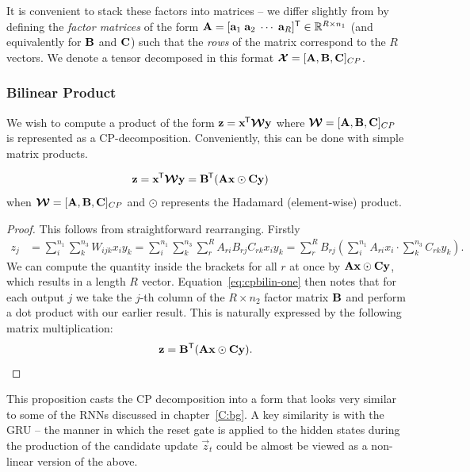 It is convenient to stack these factors into matrices --
we differ slightly from \autocite{Kolda2009} by defining the \textit{factor matrices} of the 
form \(\mathbf{A} = [\mathbf{a}_1\;\mathbf{a}_2\;\cdots\;\mathbf{a}_R]^{\mathsf{T}} \in 
\mathbb{R}^{R\times n_1}\) (and equivalently for
\(\mathbf{B}\) and \(\mathbf{C}\)) such that the  \textit{rows} of the matrix correspond to the
\(R\) vectors. 
We denote a tensor decomposed in this format 
\(\bm{\mathcal{X}} = [\mathbf{A}, \mathbf{B}, \mathbf{C}]_{CP}\).

\subsubsection{Bilinear Product}
We wish to compute a product of the form \(\mathbf{z} = \mathbf{x}^{\mkern-1.5mu\mathsf{T}}\bm{\mathcal{W}}\mathbf{y}\)
where \(\bm{\mathcal{W}} = [\mathbf{A}, \mathbf{B}, \mathbf{C}]_{CP}\) is represented as a CP-decomposition.
Conveniently, this can be done with simple matrix products.

\begin{prop} \label{prop:cpbilin}
\begin{align}
	\mathbf{z} &= \mathbf{x}^{\mkern-1.5mu\mathsf{T}}\bm{\mathcal{W}}\mathbf{y} 
			= \mathbf{B}^{\mkern-1.5mu\mathsf{T}}(\mathbf{A}\mathbf{x} \odot \mathbf{C}\mathbf{y})
\end{align}
when \(\bm{\mathcal{W}} = [\mathbf{A}, \mathbf{B}, \mathbf{C}]_{CP}\) and \(\odot\) represents the Hadamard
(element-wise) product.
\end{prop}
\begin{proof}
This follows from straightforward rearranging. Firstly
\begin{align}\label{eq:cpbilin-one}
	z_j &= \sum_{i}^{n_1} \sum_k^{n_3} W_{ijk} x_i y_k 
		= \sum_{i}^{n_1} \sum_k^{n_3} \sum_r^R A_{ri} B_{rj} C_{rk} x_i y_k
		= \sum_r^R B_{rj} \left( \sum_i^{n_1} A_{ri} x_i \cdot \sum_k^{n_3} C_{rk}y_k \right).
\end{align}
We can compute the quantity inside the brackets for all \(r\) at once
by \(\mathbf{A}\mathbf{x} \odot \mathbf{C}\mathbf{y}\), which results in a length \(R\) vector. 
Equation~\eqref{eq:cpbilin-one} then notes that for each output \(j\) we take the \(j\)-th column
of the \(R \times n_2\) factor matrix \(\mathbf{B}\) and perform a dot product with our earlier
result. This is naturally expressed by the following matrix multiplication:
\begin{equation}
	\mathbf{z} = \mathbf{B}^\mathsf{T} (\mathbf{A}\mathbf{x} \odot \mathbf{C}\mathbf{y}).
\end{equation}
\end{proof}

This proposition casts the CP decomposition into a form that looks very similar to some of the
RNNs discussed in chapter~\ref{C:bg}. A key similarity is with the GRU -- the manner in which
the reset gate is applied to the hidden states during the production of the candidate update
\(\vec{z}_t\) could be almost be viewed as a non-linear version of the above.

